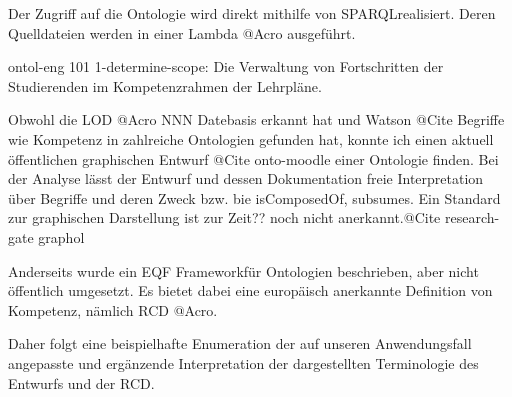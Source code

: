 \documentclass[
12pt,
english,
ngerman,
headsepline,
twoside,
openright,
numbers=noenddot,version=first
]{scrreprt}
\begin{document}
Der Zugriff auf die Ontologie wird direkt mithilfe von \glqq SPARQL\grqq  realisiert. Deren Quelldateien werden in einer Lambda @Acro ausgeführt.

ontol-eng 101
1-determine-scope: 
Die Verwaltung von Fortschritten der Studierenden im Kompetenzrahmen der Lehrpläne.

Obwohl die LOD @Acro NNN Datebasis erkannt hat und Watson @Cite Begriffe wie Kompetenz in zahlreiche Ontologien gefunden hat, konnte ich einen aktuell öffentlichen graphischen Entwurf\cite{OntoMoodle} @Cite onto-moodle einer Ontologie finden. 
Bei der Analyse lässt der Entwurf und dessen Dokumentation freie Interpretation über Begriffe und deren Zweck bzw. bie \glqq isComposedOf\grqq, \glqq subsumes\grqq. Ein Standard zur graphischen Darstellung ist zur Zeit?? noch nicht anerkannt.@Cite research-gate graphol

Anderseits wurde ein \glqq EQF Framework\grqq für Ontologien beschrieben, aber nicht öffentlich umgesetzt. Es bietet dabei eine europäisch anerkannte Definition von Kompetenz, nämlich RCD @Acro.

Daher folgt eine beispielhafte Enumeration der auf unseren Anwendungsfall angepasste und ergänzende Interpretation der dargestellten Terminologie des Entwurfs und der RCD.
\end{document}

